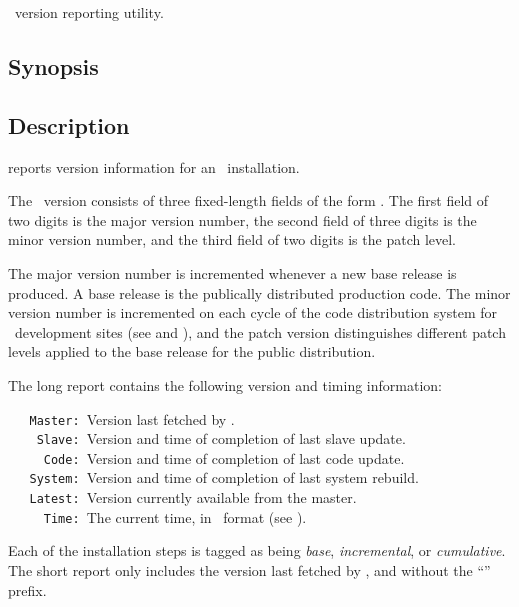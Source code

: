 \aipspp\ version reporting utility.

\subsection*{Synopsis}

\begin{synopsis}
\end{synopsis}

\subsection*{Description}

 reports version information for an \aipspp\ installation.

The \aipspp\ version consists of three fixed-length fields of the form
.  The first field of two digits is the major version number,
the second field of three digits is the minor version number, and the third
field of two digits is the patch level.

The major version number is incremented whenever a new base release is
produced.  A base release is the publically distributed production code.
The minor version number is incremented on each cycle of the code distribution
system for \aipspp\ development sites (see  and
), and the patch version distinguishes different patch levels
applied to the base release for the public distribution.

The long report contains the following version and timing information:

\noindent
\verb+   Master: +Version last fetched by .\\
\verb+    Slave: +Version and time of completion of last slave update.\\
\verb+     Code: +Version and time of completion of last code update.\\
\verb+   System: +Version and time of completion of last system rebuild.\\
\verb+   Latest: +Version currently available from the master.\\
\verb+     Time: +The current time, in \aipspp\ format (see ).

\noindent
Each of the installation steps is tagged as being {\em base},
{\em incremental}, or {\em cumulative}.  The short report only includes the
version last fetched by , and without the ``''
prefix.

